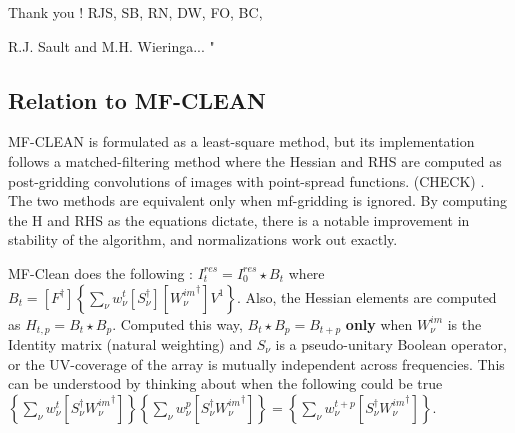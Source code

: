 \documentclass[structabstract]{aa}
\newcommand{\Fd}{{F^\dag}}
\newcommand{\Sna}{{S_{\nu}}}
\newcommand{\Snd}{{S_{\nu}^\dag}}
\newcommand{\Wimn}{{W^{im}_{\nu}}}
\newcommand{\Wimnd}{{{W^{im}_{\nu}}^\dag}}
\newcommand{\wnt}{{w_{\nu}^t}}
\newcommand{\wnp}{{w_{\nu}^p}}
\newcommand{\wntp}{{w_{\nu}^{t+p}}}
\begin{document}

\begin{acknowledgements}
      Thank you ! RJS, SB, RN, DW, FO, BC, 
\end{acknowledgements}

\begin{thebibliography}{}

   R.J. Sault and M.H. Wieringa... "
\end{thebibliography}

\begin{appendix}
\section{Relation to MF-CLEAN}\label{APP_A}


MF-CLEAN is formulated as a least-square method, but its implementation follows a matched-filtering method
where the Hessian and RHS are computed as post-gridding convolutions of images with point-spread functions.
(CHECK) . The two methods are equivalent only when mf-gridding is ignored.
By computing the H and RHS as the equations dictate, 
there is a notable improvement in stability of the algorithm, and normalizations work out exactly.

MF-Clean does the following : $I^{res}_t = I^{res}_0 \star B_t$ where $B_t = [\Fd]\left\{ \sum_{\nu} \wnt [\Snd][\Wimnd]V^{1} \right\} $. Also, the Hessian elements are computed as $H_{t,p} = B_t \star B_p$. 
Computed this way, $B_t \star B_p = B_{t+p}$ {\bf only} when $\Wimn$ is the 
Identity matrix (natural weighting) and 
$\Sna$ is a pseudo-unitary Boolean operator, or the UV-coverage of the array
is mutually independent across frequencies. 
This can be understood by thinking about when the following could be true 
$\left\{ \sum_{\nu} \wnt [\Snd\Wimnd] \right\}\left\{ \sum_{\nu} \wnp [\Snd\Wimnd]\right\} = \left\{ \sum_{\nu} \wntp [\Snd\Wimnd]\right\}$.

\end{appendix}
\end{document}
